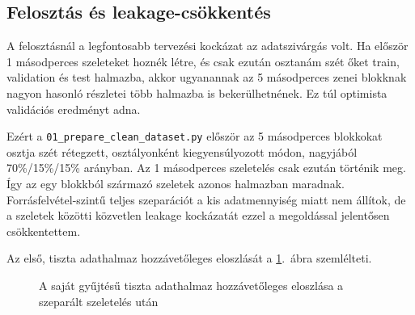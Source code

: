 \subsection{Felosztás és leakage-csökkentés}

A felosztásnál a legfontosabb tervezési kockázat az adatszivárgás volt. Ha először 1 másodperces szeleteket hoznék létre, és csak ezután osztanám szét őket train, validation és test halmazba, akkor ugyanannak az 5 másodperces zenei blokknak nagyon hasonló részletei több halmazba is bekerülhetnének. Ez túl optimista validációs eredményt adna.

Ezért a \texttt{01\_prepare\_\allowbreak clean\_\allowbreak dataset.py} először az 5 másodperces blokkokat osztja szét rétegzett, osztályonként kiegyensúlyozott módon, nagyjából 70\%/15\%/15\% arányban. Az 1 másodperces szeletelés csak ezután történik meg. Így az egy blokkból származó szeletek azonos halmazban maradnak. Forrásfelvétel-szintű teljes szeparációt a kis adatmennyiség miatt nem állítok, de a szeletek közötti közvetlen leakage kockázatát ezzel a megoldással jelentősen csökkentettem.

Az első, tiszta adathalmaz hozzávetőleges eloszlását a \ref{fig:organic_class_distribution}.~ábra szemlélteti.

\begin{figure}[H]
\centering
{}
\caption{A saját gyűjtésű tiszta adathalmaz hozzávetőleges eloszlása a szeparált szeletelés után}
\label{fig:organic_class_distribution}
\end{figure}


